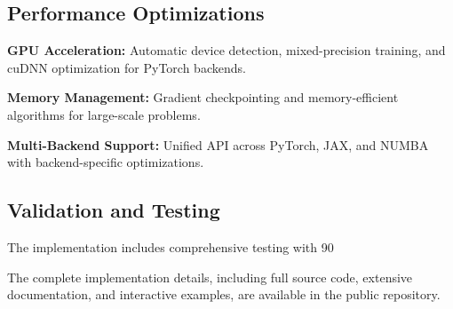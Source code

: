 \subsection{Performance Optimizations}

\textbf{GPU Acceleration:} Automatic device detection, mixed-precision training, and cuDNN optimization for PyTorch backends.

\textbf{Memory Management:} Gradient checkpointing and memory-efficient algorithms for large-scale problems.

\textbf{Multi-Backend Support:} Unified API across PyTorch, JAX, and NUMBA with backend-specific optimizations.

\subsection{Validation and Testing}

The implementation includes comprehensive testing with 90%

The complete implementation details, including full source code, extensive documentation, and interactive examples, are available in the public repository.
